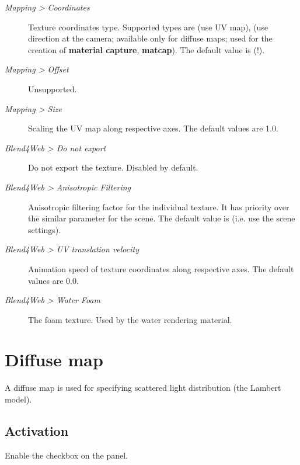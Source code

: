 \documentclass[a4paper,12pt,oneside]{sphinxmanual}
\begin{document}
\begin{description}
\item[{\emph{Mapping \textgreater{} Coordinates}}] \leavevmode
Texture coordinates type. Supported types are  (use UV map),  (use direction at the camera; available only for diffuse maps; used for the creation of \textbf{material capture}, \textbf{matcap}). The default value is  (!).

\item[{\emph{Mapping \textgreater{} Offset}}] \leavevmode
Unsupported.

\item[{\emph{Mapping \textgreater{} Size}}] \leavevmode
Scaling the UV map along respective axes. The default values are 1.0.

\item[{\emph{Blend4Web \textgreater{} Do not export}}] \leavevmode
Do not export the texture. Disabled by default.

\item[{\emph{Blend4Web \textgreater{} Anisotropic Filtering}}] \leavevmode
Anisotropic filtering factor for the individual texture. It has priority over the similar parameter for the scene. The default value is  (i.e. use the scene settings).

\item[{\emph{Blend4Web \textgreater{} UV translation velocity}}] \leavevmode
Animation speed of texture coordinates along respective axes. The default values are 0.0.

\item[{\emph{Blend4Web \textgreater{} Water Foam}}] \leavevmode
The foam texture. Used by the water rendering material.

\end{description}


\section{Diffuse map}
\label{textures:index-4}\label{textures:diffuse-map}
A diffuse map is used for specifying scattered light distribution (the Lambert model).


\subsection{Activation}
\label{textures:id4}
Enable the  checkbox on the  panel.
\end{document}

